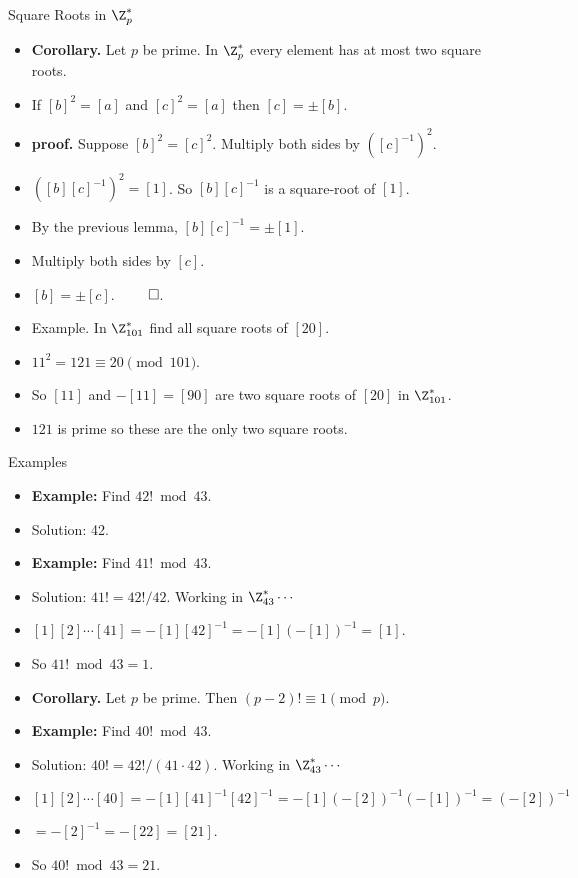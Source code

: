 \documentclass{beamer}
\begin{document}
\begin{frame}{Square Roots in $\Z_p^*$}
\begin{itemize}
  \item \textbf{Corollary.} Let $p$ be prime. In $\Z_p^*$ every element has at most two square roots.
  \item If $[b]^2 = [a]$ and $[c]^2 = [a]$ then $[c]=\pm [b]$.
  \item \textbf{proof.} Suppose $[b]^2=[c]^2$. Multiply both sides by $([c]^{-1})^2$.
  \item $([b][c]^{-1})^2 = [1]$. So $[b][c]^{-1}$ is a square-root of $[1]$.
  \item By the previous lemma, $[b][c]^{-1}=\pm[1]$.
  \item Multiply both sides by $[c]$.
  \item $[b]=\pm[c]$. $\qed$.
  \item Example. In $\Z_{101}^*$ find all square roots of $[20]$.
  \item $11^2=121\equiv 20 \pmod{101}$.
  \item So $[11]$ and $-[11]=[90]$ are two square roots of $[20]$ in $\Z_{101}^*$.
  \item $121$ is prime so these are the only two square roots.
\end{itemize}
\end{frame}

\begin{frame}{Examples}
\begin{itemize}
  \item \textbf{Example:} Find $42! \bmod 43$.
  \item Solution: 42.
  \item \textbf{Example:} Find $41! \bmod 43$.
  \item Solution: $41! = 42!/42$. Working in $\Z_{43}^* \cdots$
  \item $[1][2]\cdots[41] = -[1][42]^{-1}=-[1](-[1])^{-1} = [1]$.
  \item So $41! \bmod 43 = 1$.
  \item \textbf{Corollary.} Let $p$ be prime. Then $(p-2)! \equiv 1 \pmod{p}$.
  \item \textbf{Example:} Find $40!  \bmod 43$.
  \item Solution: $40! = 42!/(41\cdot 42)$. Working in $\Z_{43}^* \cdots$
  \item $[1][2]\cdots[40] = -[1][41]^{-1}[42]^{-1}=-[1](-[2])^{-1}(-[1])^{-1} = (-[2])^{-1}$
  \item $= -[2]^{-1} = -[22] = [21]$.
  \item So $40! \bmod 43=21$.
\end{itemize}
\end{frame}
\end{document}
